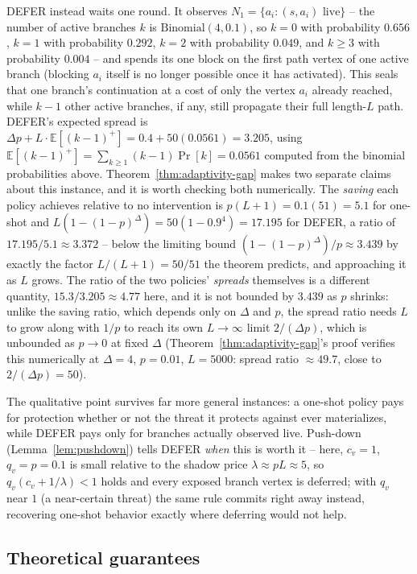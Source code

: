 \documentclass[11pt]{article}
\theoremstyle{definition}
\theoremstyle{remark}
\begin{document}
DEFER instead waits one round. It observes $N_1=\{a_i:(s,a_i)\text{ live}\}$
-- the number of active branches $k$ is $\mathrm{Binomial}(4,0.1)$, so
$k=0$ with probability $0.656$, $k=1$ with probability $0.292$, $k=2$ with
probability $0.049$, and $k\ge3$ with probability $0.004$ -- and spends its
one block on the first path vertex of one active branch (blocking $a_i$
itself is no longer possible once it has activated). This seals that one
branch's continuation at a cost of only the vertex $a_i$ already reached,
while $k-1$ other active branches, if any, still propagate their full
length-$L$ path. DEFER's expected spread is
$\Delta p+L\cdot\mathbb E[(k-1)^+]=0.4+50(0.0561)=3.205$, using
$\mathbb E[(k-1)^+]=\sum_{k\ge1}(k-1)\Pr[k]=0.0561$ computed from the
binomial probabilities above. Theorem~\ref{thm:adaptivity-gap} makes two
separate claims about this instance, and it is worth checking both
numerically. The \emph{saving} each policy achieves relative to no
intervention is $p(L+1)=0.1(51)=5.1$ for one-shot and
$L(1-(1-p)^\Delta)=50(1-0.9^4)=17.195$ for DEFER, a ratio of
$17.195/5.1\approx3.372$ -- below the limiting bound
$(1-(1-p)^\Delta)/p\approx3.439$ by exactly the factor $L/(L+1)=50/51$ the
theorem predicts, and approaching it as $L$ grows. The ratio of the two
policies' \emph{spreads} themselves is a different quantity,
$15.3/3.205\approx4.77$ here, and it is not bounded by $3.439$ as $p$
shrinks: unlike the saving ratio, which depends only on $\Delta$ and $p$,
the spread ratio needs $L$ to grow along with $1/p$ to reach its own
$L\to\infty$ limit $2/(\Delta p)$, which is unbounded as $p\to0$ at fixed
$\Delta$ (Theorem~\ref{thm:adaptivity-gap}'s proof verifies this
numerically at $\Delta=4$, $p=0.01$, $L=5000$: spread ratio $\approx49.7$,
close to $2/(\Delta p)=50$).

The qualitative point survives far more general instances: a one-shot
policy pays for protection whether or not the threat it protects against
ever materializes, while DEFER pays only for branches actually observed
live. Push-down (Lemma~\ref{lem:pushdown}) tells DEFER \emph{when} this is
worth it -- here, $c_v=1$, $q_v=p=0.1$ is small relative to the shadow
price $\lambda\approx pL\approx5$, so $q_v(c_v+1/\lambda)<1$ holds and
every exposed branch vertex is deferred; with $q_v$ near $1$ (a
near-certain threat) the same rule commits right away instead, recovering
one-shot behavior exactly where deferring would not help.

\subsection{Theoretical guarantees}\label{sec:defer-theory}
\end{document}
